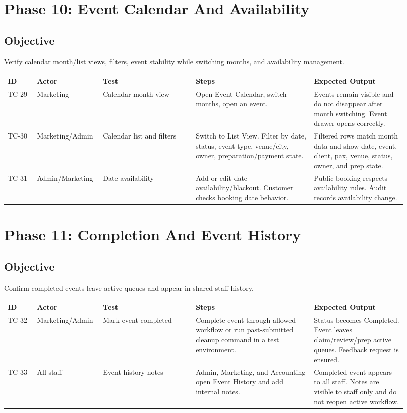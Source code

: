 \documentclass[11pt,a4paper]{article}
\begin{document}
\section{Phase 10: Event Calendar And Availability}
\subsection{Objective}
Verify calendar month/list views, filters, event stability while switching months, and availability management.

\begin{longtable}{p{0.07\linewidth}p{0.13\linewidth}p{0.22\linewidth}p{0.28\linewidth}p{0.22\linewidth}}
\toprule
\textbf{ID} & \textbf{Actor} & \textbf{Test} & \textbf{Steps} & \textbf{Expected Output} \\
\midrule
TC-29 & Marketing & Calendar month view & Open Event Calendar, switch months, open an event. & Events remain visible and do not disappear after month switching. Event drawer opens correctly. \\
TC-30 & Marketing/Admin & Calendar list and filters & Switch to List View. Filter by date, status, event type, venue/city, owner, preparation/payment state. & Filtered rows match month data and show date, event, client, pax, venue, status, owner, and prep state. \\
TC-31 & Admin/Marketing & Date availability & Add or edit date availability/blackout. Customer checks booking date behavior. & Public booking respects availability rules. Audit records availability change. \\
\bottomrule
\end{longtable}

\section{Phase 11: Completion And Event History}
\subsection{Objective}
Confirm completed events leave active queues and appear in shared staff history.

\begin{longtable}{p{0.07\linewidth}p{0.13\linewidth}p{0.22\linewidth}p{0.28\linewidth}p{0.22\linewidth}}
\toprule
\textbf{ID} & \textbf{Actor} & \textbf{Test} & \textbf{Steps} & \textbf{Expected Output} \\
\midrule
TC-32 & Marketing/Admin & Mark event completed & Complete event through allowed workflow or run past-submitted cleanup command in a test environment. & Status becomes Completed. Event leaves claim/review/prep active queues. Feedback request is ensured. \\
TC-33 & All staff & Event history notes & Admin, Marketing, and Accounting open Event History and add internal notes. & Completed event appears to all staff. Notes are visible to staff only and do not reopen active workflow. \\
\bottomrule
\end{longtable}
\end{document}
